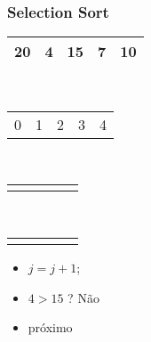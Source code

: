 \documentclass{beamer}
\begin{document}
\begin{frame}
    \frametitle{Selection Sort}
    \begin{center}
        \begin{table}
            \begin{tabular}{| p{0.25cm} | p{0.25cm} | p{0.25cm} | p{0.25cm} | p{0.25cm} |}
                \hline
                20 & 4 & 15 & 7 & 10 \\ \hline
            \end{tabular} \\
            \begin{tabular}{p{0.25cm} p{0.25cm} p{0.25cm} p{0.25cm} p{0.25cm}}
                0 & 1 & 2 & 3 & 4
            \end{tabular} \\
            \begin{tabular}{p{0.25cm} p{0.25cm} p{0.25cm} p{0.25cm} p{0.25cm}}
                \color{blue}{$\uparrow$} & & \color{red}{$\uparrow$} & &
            \end{tabular} \\
            \begin{tabular}{p{0.25cm} p{0.25cm} p{0.25cm} p{0.25cm} p{0.25cm}}
                \color{blue}{i} & & \color{red}{j} & &
            \end{tabular}
        \end{table}
	\end{center}
    \color{green}{$troca = 1$}
    \begin{itemize}[<+->]
        \item $j = j + 1$;
        \item $4 > 15$ ? Não
        \item próximo
    \end{itemize}
\end{frame}
\end{document}
